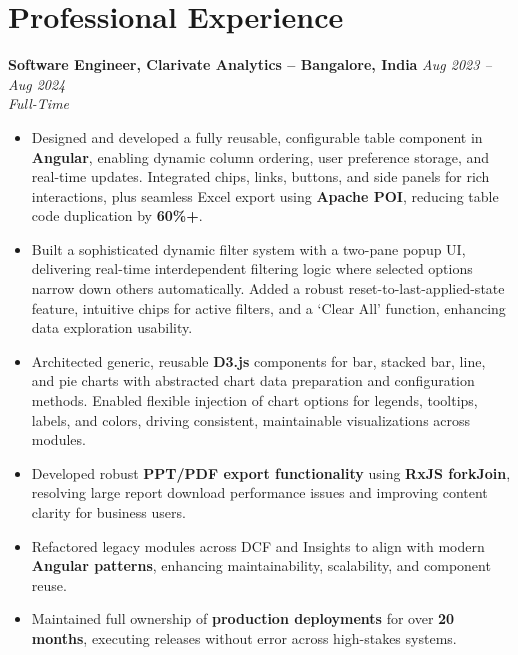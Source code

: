 \documentclass[10pt, letterpaper]{article}
\newenvironment{highlights}{\begin{itemize}[topsep=0.10 cm, parsep=0.10 cm, partopsep=0pt, itemsep=2pt, leftmargin=10pt]}{\end{itemize}}
\begin{document}
\newcommand{\experienceentry}[4]{%
  \noindent\textbf{#1} \hfill \textit{#2}\\
  \textit{#3} \\
  #4
  \vspace{0.3cm}
}

\section{Professional Experience}

\experienceentry
  {Software Engineer, Clarivate Analytics -- Bangalore, India}
  {Aug 2023 -- Aug 2024}
  {Full-Time}
  {
    \begin{highlights}
        \item Designed and developed a fully reusable, configurable table component in \textbf{Angular}, enabling dynamic column ordering, user preference storage, and real-time updates. Integrated chips, links, buttons, and side panels for rich interactions, plus seamless Excel export using \textbf{Apache POI}, reducing table code duplication by \textbf{60\%+}.

        \item Built a sophisticated dynamic filter system with a two-pane popup UI, delivering real-time interdependent filtering logic where selected options narrow down others automatically. Added a robust reset-to-last-applied-state feature, intuitive chips for active filters, and a ‘Clear All’ function, enhancing data exploration usability.
        
        \item Architected generic, reusable \textbf{D3.js} components for bar, stacked bar, line, and pie charts with abstracted chart data preparation and configuration methods. Enabled flexible injection of chart options for legends, tooltips, labels, and colors, driving consistent, maintainable visualizations across modules.
        
        
        \item Developed robust \textbf{PPT/PDF export functionality} using \textbf{RxJS forkJoin}, resolving large report download performance issues and improving content clarity for business users.
        
        \item Refactored legacy modules across DCF and Insights to align with modern \textbf{Angular patterns}, enhancing maintainability, scalability, and component reuse.
        
        \item Maintained full ownership of \textbf{production deployments} for over \textbf{20 months}, executing releases without error across high-stakes systems.
        

\end{highlights}}
\end{document}
